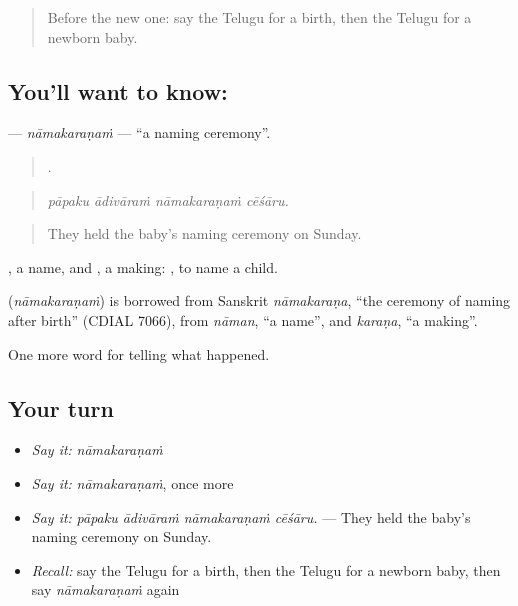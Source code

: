 \label{lesson:TE-C334-namakaranam}



\begin{quote}
Before the new one: say the Telugu for a birth, then the Telugu for a newborn baby.
\end{quote}

\subsection*{You'll want to know: }
\textbf{} — \emph{nāmakaraṇaṁ} — \textquotedblleft{}a naming ceremony\textquotedblright{}.

\begin{quote}
   .
\end{quote}

\begin{quote}
\emph{pāpaku ādivāraṁ nāmakaraṇaṁ cēśāru.}
\end{quote}

\begin{quote}
They held the baby's naming ceremony on Sunday.
\end{quote}

, a name, and , a making:  , to name a child.

\begin{cousinweb}
\textbf{} (\emph{nāmakaraṇaṁ}) is borrowed from Sanskrit \emph{nāmakaraṇa}, \textquotedblleft{}the ceremony of naming after birth\textquotedblright{} (CDIAL 7066), from \emph{nāman}, \textquotedblleft{}a name\textquotedblright{}, and \emph{karaṇa}, \textquotedblleft{}a making\textquotedblright{}.
\end{cousinweb}

\begin{grammarlens}[title={What you've built}]
One more word for telling what happened.
\end{grammarlens}

\subsection*{Your turn}
\begin{itemize}
\raggedright
  \item \emph{Say it:} \emph{nāmakaraṇaṁ}
  \item \emph{Say it:} \emph{nāmakaraṇaṁ}, once more
  \item \emph{Say it:} \emph{pāpaku ādivāraṁ nāmakaraṇaṁ cēśāru.} — They held the baby's naming ceremony on Sunday.
  \item \emph{Recall:} say the Telugu for a birth, then the Telugu for a newborn baby, then say \emph{nāmakaraṇaṁ} again
\end{itemize}

